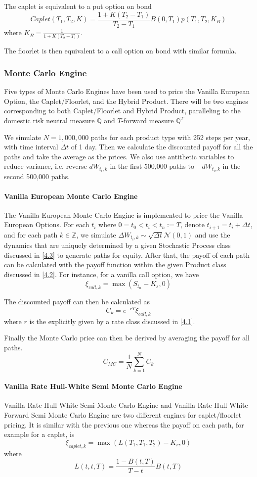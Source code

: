 \documentclass[11pt]{article}
\numberwithin{equation}{section}
\theoremstyle{remark}
\begin{document}
The caplet is equivalent to a put option on bond
$$Caplet(T_1, T_2, K) = \frac{1+K(T_2-T_1)}{T_2-T_1}B(0, T_1)p(T_1, T_2, K_B)$$
where $K_B=\frac{1}{1+K(T_2-T_1)}$.

The floorlet is then equivalent to a call option on bond with similar formula.

\subsubsection{Monte Carlo Engine}\label{4.4.2}
Five types of Monte Carlo Engines have been used to price the Vanilla European Option, the Caplet/Floorlet, and the Hybrid Product. There will be two engines corresponding to both Caplet/Floorlet and Hybrid Product, paralleling to the domestic risk neutral measure $\mathbb{Q}$ and $T$-forward measure $\mathbb{Q}^T$

We simulate $N = 1,000,000$ paths for each product type with 252 steps per year, with time interval $\Delta t$ of 1 day. Then we calculate the discounted payoff for all the paths and take the average as the prices. We also use antithetic variables to reduce variance, i.e. reverse $dW_{t_i,k}$ in the first 500,000 paths to $-dW_{t_i,k}$ in the second 500,000 paths.

\paragraph{Vanilla European Monte Carlo Engine}
The Vanilla European Monte Carlo Engine is implemented to price the Vanilla European Options. For each $t_i$ where $0 = t_0 < t_i < t_n := T$, denote $t_{i+1} = t_i+ \Delta t$, and for each path $k \in \mathbb{Z}$, we simulate $\Delta W_{t_i,k}\sim \sqrt{\Delta t} \mathcal{N}(0,1)$ and use the dynamics that are uniquely determined by a given Stochastic Process class discussed in \ref{4.3} to generate paths for equity. After that, the payoff of each path can be calculated with the payoff function within the given Product class discussed in \ref{4.2}. For instance, for a vanilla call option, we have
$$\xi_{call,k} = \max \left(S_{t_n}-K_s, 0\right)$$

The discounted payoff can then be calculated as
$$C_{k} = e^{-rT}\xi_{call, k}$$
where $r$ is the explicitly given by a rate class discussed in \ref{4.1}.

Finally the Monte Carlo price can then be derived by averaging the payoff for all paths.
$$C_{MC} = \frac{1}{N}\sum_{k=1}^{N}C_k$$

\paragraph{Vanilla Rate Hull-White Semi Monte Carlo Engine}
Vanilla Rate Hull-White Semi Monte Carlo Engine and Vanilla Rate Hull-White Forward Semi Monte Carlo Engine are two different engines for caplet/floorlet pricing. It is similar with the previous one whereas the payoff on each path, for example for a caplet, is
$$\xi_{caplet,k} = \max \left( L(T_1, T_1, T_2)-K_r, 0\right)$$
where
$$L(t, t, T) = \frac{1-B(t,T)}{T-t}B(t,T)$$
\end{document}
